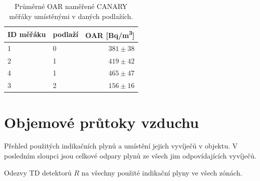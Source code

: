 \begin{table}[H]
    \centering
    \caption{Průměrné OAR naměřené CANARY měřáky umístěnými v daných podlažích.}
    \label{tab:skala75_OARprumerne_CANARY}
    \begin{tabular}{llr}
        \toprule
        ID měřáku & podlaží & OAR [\si{Bq/m^3}]\\
        \midrule
        1 & 0 & $381\pm38$\\
        2 & 1 & $419\pm42$\\
        4 & 1 & $465\pm47$\\
        3 & 2 & $156\pm16$\\
        \bottomrule
    \end{tabular}
\end{table}

\section{Objemové průtoky vzduchu}

\begin{table}[H]
    \centering
    \caption{Přehled použitých indikačních plynů a umístění jejich vyvíječů v objektu. V posledním sloupci jsou celkové odpary plynů ze všech jim odpovídajících vyvíječů.}
    \label{tab:skala75_indikacniPlyny}
    
\end{table}
\begin{table}[H]
    \centering
    \caption{Odezvy TD detektorů $R$ na všechny použité indikační plyny ve všech zónách.}
    \label{tab:skala75_odezvyTD}\\
    
\end{table}

